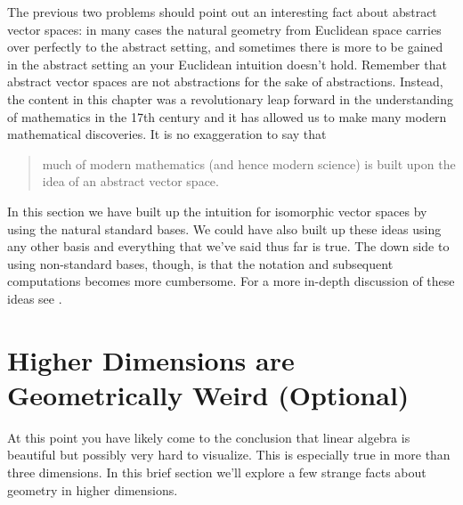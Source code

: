 The previous two problems should point out an interesting fact about abstract vector spaces: in
many cases the natural geometry from Euclidean space carries over perfectly to the
abstract setting, and sometimes there is more to be gained in the abstract setting an your
Euclidean intuition doesn't hold.  Remember that abstract vector spaces are not
abstractions for the sake of abstractions.  Instead, the content in this chapter was a
revolutionary leap forward in the understanding of mathematics in the 17th century and it
has allowed us to make many modern mathematical discoveries.  It is no exaggeration to say
that 
\begin{quote}
    much of modern mathematics (and hence modern science) is built upon the idea of an
    abstract vector space.
\end{quote}

In this section we have built up the intuition for isomorphic vector spaces by using the
natural standard bases.  We could have also built up these ideas using any other basis and
everything that we've said thus far is true.  The down side to using non-standard bases,
though, is that the notation and subsequent computations becomes more cumbersome.  For a
more in-depth discussion of these ideas see \cite{Lay}.

\newpage\section{Higher Dimensions are Geometrically Weird (Optional)}
At this point you have likely come to the conclusion that linear algebra is beautiful but
possibly very hard to visualize.  This is especially true in more than three dimensions.
In this brief section we'll explore a few strange facts about geometry in higher
dimensions.

